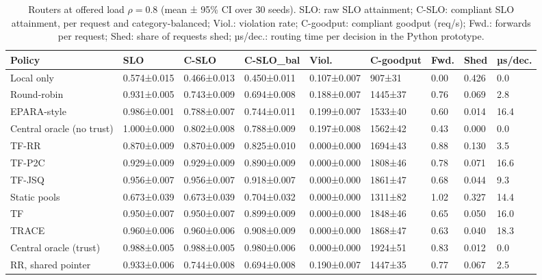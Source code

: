\documentclass[journal]{IEEEtran}
\begin{document}
\begin{table}[!t]
\centering
\caption{Routers at offered load \(\rho=0.8\) (mean ± 95\% CI over 30 seeds). SLO: raw SLO attainment; C-SLO: compliant SLO attainment, per request and category-balanced; Viol.: violation rate; C-goodput: compliant goodput (req/s); Fwd.: forwards per request; Shed: share of requests shed; µs/dec.: routing time per decision in the Python prototype.}
\footnotesize
\begin{adjustbox}{max width=\textwidth}
\begin{tabular}{lllllllll}
\toprule
Policy & SLO & C-SLO & C-SLO\_bal & Viol. & C-goodput & Fwd. & Shed & µs/dec. \\
\midrule
Local only & 0.574±0.015 & 0.466±0.013 & 0.450±0.011 & 0.107±0.007 & 907±31 & 0.00 & 0.426 & 0.0 \\
Round-robin & 0.931±0.005 & 0.743±0.009 & 0.694±0.008 & 0.188±0.007 & 1445±37 & 0.76 & 0.069 & 2.8 \\
EPARA-style & 0.986±0.001 & 0.788±0.007 & 0.744±0.011 & 0.199±0.007 & 1533±40 & 0.60 & 0.014 & 16.4 \\
Central oracle (no trust) & 1.000±0.000 & 0.802±0.008 & 0.788±0.009 & 0.197±0.008 & 1562±42 & 0.43 & 0.000 & 0.0 \\
TF-RR & 0.870±0.009 & 0.870±0.009 & 0.825±0.010 & 0.000±0.000 & 1694±43 & 0.88 & 0.130 & 3.5 \\
TF-P2C & 0.929±0.009 & 0.929±0.009 & 0.890±0.009 & 0.000±0.000 & 1808±46 & 0.78 & 0.071 & 16.6 \\
TF-JSQ & 0.956±0.007 & 0.956±0.007 & 0.918±0.007 & 0.000±0.000 & 1861±47 & 0.68 & 0.044 & 9.3 \\
Static pools & 0.673±0.039 & 0.673±0.039 & 0.704±0.032 & 0.000±0.000 & 1311±82 & 1.02 & 0.327 & 14.4 \\
TF & 0.950±0.007 & 0.950±0.007 & 0.899±0.009 & 0.000±0.000 & 1848±46 & 0.65 & 0.050 & 16.0 \\
TRACE & 0.960±0.006 & 0.960±0.006 & 0.908±0.009 & 0.000±0.000 & 1868±47 & 0.63 & 0.040 & 18.3 \\
Central oracle (trust) & 0.988±0.005 & 0.988±0.005 & 0.980±0.006 & 0.000±0.000 & 1924±51 & 0.83 & 0.012 & 0.0 \\
RR, shared pointer & 0.933±0.006 & 0.744±0.008 & 0.694±0.008 & 0.190±0.007 & 1447±35 & 0.77 & 0.067 & 2.5 \\
\bottomrule
\end{tabular}
\end{adjustbox}
\end{table}
\end{document}
